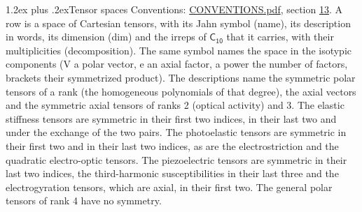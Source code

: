 \documentclass[10pt,a4paper]{article}
\makeatletter
\renewcommand\section{\@startsection{section}{1}{\z@}{-3ex plus -1ex minus -.2ex}%
  {1.2ex plus .2ex}{\normalfont\large\sffamily\bfseries\color{parttitle}}}
\numberwithin{equation}{section}
\newcommand{\grp}[1]{\mathsf{#1}}
\makeatother
\begin{document}
\section{Tensor spaces}\label{s:tensor_spaces}
Conventions: \href{../../CONVENTIONS.pdf}{CONVENTIONS.pdf}, section \href{../../CONVENTIONS.pdf\#conv.13}{13}.
\leavevmode\label{n:head.name}\label{n:head.description}\label{n:head.dim}\label{n:head.decomposition}A row is a space of Cartesian tensors, with its Jahn symbol (name), its description in words, its dimension (dim) and the irreps of $\grp{C_{10}}$ that it carries, with their multiplicities (decomposition). \label{n:label.jahn}The same symbol names the space in the isotypic components (V a polar vector, e an axial factor, a power the number of factors, brackets their symmetrized product). The descriptions name the symmetric polar tensors of a rank (the homogeneous polynomials of that degree), the axial vectors and the symmetric axial tensors of ranks 2 (optical activity) and 3. The elastic stiffness tensors are symmetric in their first two indices, in their last two and under the exchange of the two pairs. The photoelastic tensors are symmetric in their first two and in their last two indices, as are the electrostriction and the quadratic electro-optic tensors. The piezoelectric tensors are symmetric in their last two indices, the third-harmonic susceptibilities in their last three and the electrogyration tensors, which are axial, in their first two. The general polar tensors of rank 4 have no symmetry.
\end{document}
